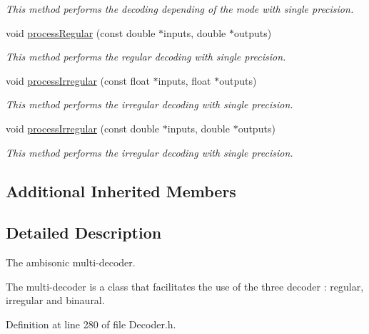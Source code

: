 \begin{DoxyCompactItemize}
\begin{DoxyCompactList}\small\item\em This method performs the decoding depending of the mode with single precision. \end{DoxyCompactList}\item 
void \hyperlink{class_hoa2_d_1_1_decoder_multi_a594583b4853dcabf5f655412faad0fe7}{process\-Regular} (const double $\ast$inputs, double $\ast$outputs)
\begin{DoxyCompactList}\small\item\em This method performs the regular decoding with single precision. \end{DoxyCompactList}\item 
void \hyperlink{class_hoa2_d_1_1_decoder_multi_ae7b3be8b1b39a2242a4a270d5278a4f6}{process\-Irregular} (const float $\ast$inputs, float $\ast$outputs)
\begin{DoxyCompactList}\small\item\em This method performs the irregular decoding with single precision. \end{DoxyCompactList}\item 
void \hyperlink{class_hoa2_d_1_1_decoder_multi_a11493b383a19d621202acebb17568000}{process\-Irregular} (const double $\ast$inputs, double $\ast$outputs)
\begin{DoxyCompactList}\small\item\em This method performs the irregular decoding with single precision. \end{DoxyCompactList}\end{DoxyCompactItemize}
\subsection*{Additional Inherited Members}


\subsection{Detailed Description}
The ambisonic multi-\/decoder. 

The multi-\/decoder is a class that facilitates the use of the three decoder \-: regular, irregular and binaural. 

Definition at line 280 of file Decoder.\-h.



